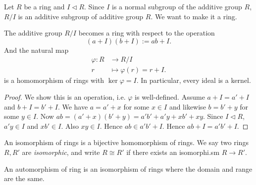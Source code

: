 Let $R$ be a ring and $I \triangleleft R$. Since $I$ is a normal subgroup of the additive group $R$, $R / I$ is an additive subgroup of additive group $R$. We want to make it a ring.
\begin{theorem}
	The additive group $R / I$ becomes a ring with respect to the operation
	\[
		(a+I)(b+I) := ab + I
	.\] 
	And the natural map
	\begin{align*}
		\varphi: R &\longrightarrow R/I \\
		r &\longmapsto \varphi(r) = r+I
	.\end{align*}
	is a homomorphism of rings with $\operatorname{ker} \varphi  = I$.
	In particular, every ideal is a kernel.
\end{theorem}
\begin{proof}
	We show this is an operation, i.e. $\varphi$ is well-defined. Assume $a+I = a'+I$ and $b+I = b'+I$. We have $a = a' + x$ for some $x \in I$ and likewise $b = b' + y$ for some $y \in I$. Now $ab = (a'+x)(b'+y) = a'b' + a'y + x b' + xy$. Since $I \triangleleft R$, $a'y \in I$ and $x b' \in I$. Also $xy \in I$. Hence $ab \in a'b' + I$. Hence $ab + I = a'b' + I$.
\end{proof}

\begin{definition}[Isomorphism]
	An isomorphism of rings is a bijective homomorphism of rings. We say two rings $R, R'$ are \textit{isomorphic}, and write $R \cong R'$ if there exists an isomorphi.sm $R \to R'$.
\end{definition}
\begin{definition}[Automorphism]
	An automorphism of ring is an isomorphism of rings where the domain and range are the same.
\end{definition}
